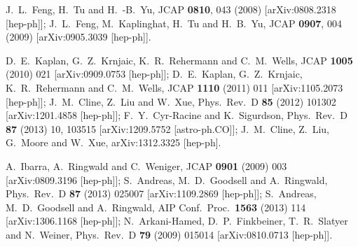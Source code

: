 \documentclass[12pt]{article}
\begin{document}
{{\begin{thebibliography}{999}
  
  
  J.~L.~Feng, H.~Tu and H.~-B.~Yu,
  JCAP {\bf 0810}, 043 (2008)
  [arXiv:0808.2318 [hep-ph]];
  J.~L.~Feng, M.~Kaplinghat, H.~Tu and H.~B.~Yu,
  JCAP {\bf 0907}, 004 (2009)
  [arXiv:0905.3039 [hep-ph]].
  
   D.~E.~Kaplan, G.~Z.~Krnjaic, K.~R.~Rehermann and C.~M.~Wells,
  JCAP {\bf 1005} (2010) 021
  [arXiv:0909.0753 [hep-ph]];
  D.~E.~Kaplan, G.~Z.~Krnjaic, K.~R.~Rehermann and C.~M.~Wells,
  JCAP {\bf 1110} (2011) 011
  [arXiv:1105.2073 [hep-ph]];
  J.~M.~Cline, Z.~Liu and W.~Xue,
  Phys.\ Rev.\ D {\bf 85} (2012) 101302
  [arXiv:1201.4858 [hep-ph]];
  F.~Y.~Cyr-Racine and K.~Sigurdson,
  Phys.\ Rev.\ D {\bf 87} (2013) 10,  103515
  [arXiv:1209.5752 [astro-ph.CO]];
  J.~M.~Cline, Z.~Liu, G.~Moore and W.~Xue,
  arXiv:1312.3325 [hep-ph].
  
  A.~Ibarra, A.~Ringwald and C.~Weniger,
  JCAP {\bf 0901} (2009) 003
  [arXiv:0809.3196 [hep-ph]];
  S.~Andreas, M.~D.~Goodsell and A.~Ringwald,
  Phys.\ Rev.\ D {\bf 87} (2013) 025007
  [arXiv:1109.2869 [hep-ph]];
  S.~Andreas, M.~D.~Goodsell and A.~Ringwald,
  AIP Conf.\ Proc.\  {\bf 1563} (2013) 114
  [arXiv:1306.1168 [hep-ph]];
  N.~Arkani-Hamed, D.~P.~Finkbeiner, T.~R.~Slatyer and N.~Weiner,
  Phys.\ Rev.\ D {\bf 79} (2009) 015014
  [arXiv:0810.0713 [hep-ph]].
  

\end{thebibliography}}}
\end{document}
